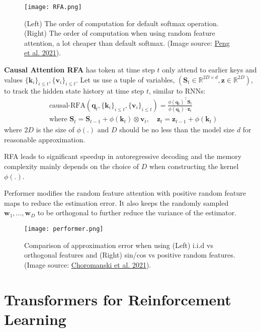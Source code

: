 \documentclass[12pt]{article}
\begin{document}
\begin{figure}[h!]
    \centering
    \texttt{[image: RFA.png]}
    \caption{(Left) The order of computation for default softmax operation. (Right) The order of computation when using random feature attention, a lot cheaper than default softmax. (Image source: \href{https://arxiv.org/abs/2103.02143}{Peng et al. 2021}).}
\end{figure}

\textbf{Causal Attention RFA} has token at time step $t$ only attend to earlier keys and values $\{\mathbf{k}_i\}_{i \leq t}, \{\mathbf{v}_i\}_{i \leq t}$. Let us use a tuple of variables, $(\mathbf{S}_t \in \mathbb{R}^{2D \times d}, \mathbf{z} \in \mathbb{R}^{2D})$, to track the hidden state history at time step $t$, similar to RNNs:
\[
\begin{aligned}
&\text{causal-RFA}(\mathbf{q}_t, \{\mathbf{k}_i\}_{i \leq t}, \{\mathbf{v}_i\}_{i \leq t}) = \frac{\phi(\mathbf{q}_t)^\top \mathbf{S}_t}{\phi(\mathbf{q}_t) \cdot \mathbf{z}_t} \\
&\text{where } 
\mathbf{S}_t = \mathbf{S}_{t-1} + \phi(\mathbf{k}_t)\otimes\mathbf{v}_t,
\quad 
\mathbf{z}_t = \mathbf{z}_{t-1} + \phi(\mathbf{k}_t)
\end{aligned}
\]
where $2D$ is the size of $\phi(.)$ and $D$ should be no less than the model size $d$ for reasonable approximation.

RFA leads to significant speedup in autoregressive decoding and the memory complexity mainly depends on the choice of $D$ when constructing the kernel $\phi(.)$.

Performer modifies the random feature attention with positive random feature maps to reduce the estimation error. It also keeps the randomly sampled $\mathbf{w}_1, \dots, \mathbf{w}_D$ to be orthogonal to further reduce the variance of the estimator.

\begin{figure}[h!]
    \centering
    \texttt{[image: performer.png]}
    \caption{Comparison of approximation error when using (Left) i.i.d vs orthogonal features and (Right) sin/cos vs positive random features. (Image source: \href{https://arxiv.org/abs/2009.14794}{Choromanski et al. 2021}).}
\end{figure}

\section{Transformers for Reinforcement Learning}
\end{document}

